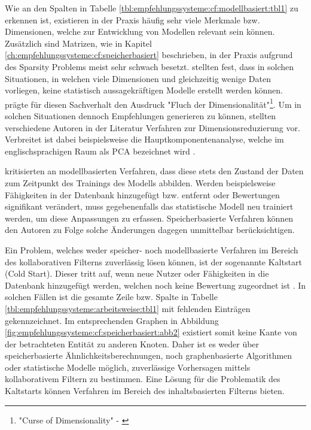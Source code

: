 Wie an den Spalten in Tabelle \ref{tbl:empfehlungssysteme:cf:modellbasiert:tbl1} zu erkennen ist, existieren in der Praxis häufig sehr viele Merkmale bzw. Dimensionen, welche zur Entwicklung von Modellen relevant sein können. Zusätzlich sind Matrizen, wie in Kapitel \ref{ch:empfehlungssysteme:cf:speicherbasiert} beschrieben, in der Praxis aufgrund des Sparsity Problems meist sehr schwach besetzt. \textcite[S. 1]{boratto:2014} stellten fest, dass in solchen Situationen, in welchen viele Dimensionen und gleichzeitig wenige Daten vorliegen, keine statistisch aussagekräftigen Modelle erstellt werden können. \textcite[S. 94, Z. 7]{bellman:1961} prägte für diesen Sachverhalt den Ausdruck "Fluch der Dimensionalität"\footnote{"Curse of Dimensionality" - \textcite[S. 94, Z. 7]{bellman:1961}}. Um in solchen Situationen dennoch Empfehlungen generieren zu können, stellten verschiedene Autoren in der Literatur Verfahren zur Dimensionsreduzierung vor. Verbreitet ist dabei beispielsweise die Hauptkomponentenanalyse, welche im englischsprachigen Raum als \ac{PCA} bezeichnet wird \cite[S. 1ff.]{vaswani:2018}.

\textcite[S. 1f.]{pennock:2000} kritisierten an modellbasierten Verfahren, dass diese stets den Zustand der Daten zum Zeitpunkt des Trainings des Modells abbilden. Werden beispielsweise Fähigkeiten in der Datenbank hinzugefügt bzw. entfernt oder Bewertungen signifikant verändert, muss gegebenenfalls das statistische Modell neu trainiert werden, um diese Anpassungen zu erfassen. Speicherbasierte Verfahren können den Autoren zu Folge solche Änderungen dagegen unmittelbar berücksichtigen.

Ein Problem, welches weder speicher- noch modellbasierte Verfahren im Bereich des kollaborativen Filterns zuverlässig lösen können, ist der sogenannte Kaltstart (Cold Start). Dieser tritt auf, wenn neue Nutzer oder Fähigkeiten in die Datenbank hinzugefügt werden, welchen noch keine Bewertung zugeordnet ist \cite[S. 5]{huang:2004}. In solchen Fällen ist die gesamte Zeile bzw. Spalte in Tabelle \ref{tbl:empfehlungssysteme:arbeitsweise:tbl1} mit fehlenden Einträgen gekennzeichnet. Im entsprechenden Graphen in Abbildung \ref{fig:empfehlungssysteme:cf:speicherbasiert:abb2} existiert somit keine Kante von der betrachteten Entität zu anderen Knoten. Daher ist es weder über speicherbasierte Ähnlichkeitsberechnungen, noch graphenbasierte Algorithmen oder statistische Modelle möglich, zuverlässige Vorhersagen mittels kollaborativem Filtern zu bestimmen. Eine Lösung für die Problematik des Kaltstarts können Verfahren im Bereich des inhaltsbasierten Filterns bieten. %


